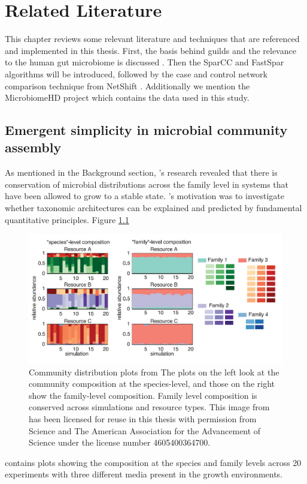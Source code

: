 \chapter{Related Literature}

This chapter reviews some relevant literature and techniques that are referenced and implemented in this thesis. First, the basis behind guilds and the relevance to the human gut microbiome is discussed \citep{Goldford2018}.  Then the SparCC \citep{Friedman2012} and FastSpar \citep{Watts2018} algorithms will be introduced, followed by the case and control network comparison technique from NetShift \citep{Kuntal2018}. Additionally we mention the MicrobiomeHD project \citep{Duvallet2017} which contains the data used in this study.

\section{Emergent simplicity in microbial community assembly}\label{lit-gold}
As mentioned in the Background section, \citeauthor{Goldford2018}'s research revealed that there is conservation of microbial distributions across the family level in systems that have been allowed to grow to a stable state. \citeauthor{Goldford2018}'s motivation was to investigate whether taxonomic architectures can be explained and predicted by fundamental quantitative principles. Figure \ref{fig:rel-gold}
\begin{figure}[!thbp]
    \centering
    \includegraphics[width=0.95\linewidth]{figure/background/goldford_img.png}
    \caption[Community distribution plots from Goldford et al.]{Community distribution plots from \citeauthor{Goldford2018} The plots on the left look at the community composition at the species-level, and those on the right show the family-level composition. Family level composition is conserved across simulations and resource types. This image from \citep{Goldford2018} has been licensed for reuse in this thesis with permission from Science and The American Association for the Advancement of Science under the license number 4605400364700.}
    \label{fig:rel-gold}
\end{figure}
contains plots showing the composition at the species and family levels across 20 experiments with three different media present in the growth environments. 

